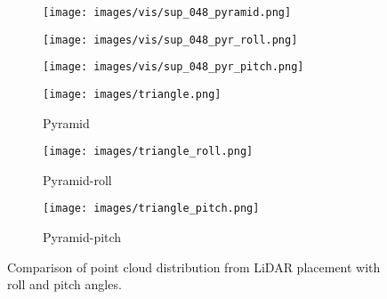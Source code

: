 \documentclass[10pt,twocolumn,letterpaper]{article}
\begin{document}
\begin{figure}[ht]
        \begin{subfigure}[b]{0.16\textwidth}
  \texttt{[image: images/vis/sup\_048\_pyramid.png]}
    \end{subfigure}%
    \begin{subfigure}[b]{0.16\textwidth}
  \texttt{[image: images/vis/sup\_048\_pyr\_roll.png]}
    \end{subfigure}%
    \begin{subfigure}[b]{0.16\textwidth}
  \texttt{[image: images/vis/sup\_048\_pyr\_pitch.png]}
    \end{subfigure}%


    \begin{subfigure}[b]{0.16\textwidth}
  \texttt{[image: images/triangle.png]}
                \caption{Pyramid}
    \end{subfigure}%
    \begin{subfigure}[b]{0.16\textwidth}
  \texttt{[image: images/triangle\_roll.png]}
                \caption{Pyramid-roll}
    \end{subfigure}%
    \begin{subfigure}[b]{0.16\textwidth}
  \texttt{[image: images/triangle\_pitch.png]}
                \caption{Pyramid-pitch}
    \end{subfigure}%
  \caption{Comparison of point cloud distribution from LiDAR placement with roll and pitch angles.}
  \label{fig:vis2}
   \vspace*{-5mm}
\end{figure}
\end{document}
